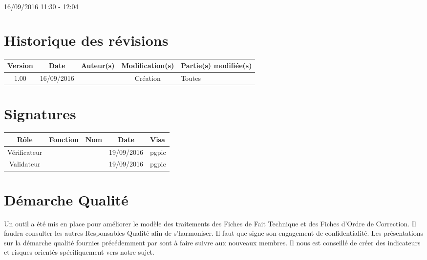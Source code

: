 \documentclass [a4paper] {article}
\begin{document}
\rhead{}

16/09/2016
\hfill   
\hfill 	11:30 - 12:04 				%



\section*{Historique des révisions}
\begin{center}
			\begin{tabular}{| c | c | c | c | p{4cm} |}
				\hline
				\rowcolor{Gray}
				Version & Date & Auteur(s) & Modification(s) & Partie(s) modifiée(s)		 \\
				\hline
				1.00 & 16/09/2016 & \Kafui & Création & Toutes \\
		\hline		
			\end{tabular}
		\end{center}

\section*{Signatures}

		\begin{center}
			\begin{tabular}{| c | c | c | c | p{4cm} |}
				\hline
				\rowcolor{Gray}
				Rôle & Fonction & Nom & Date & Visa		 \\
				\hline
				Vérificateur & \RGC & \Melissa & 19/09/2016 & pgpic \\[30pt]
				\hline
				Validateur & \CP & \Pierre & 19/09/2016 & pgpic \\[30pt]	
				\hline
			\end{tabular}
		\end{center}


\section{Démarche Qualité}
\paragraph*{}
Un outil a été mis en place pour améliorer le modèle des traitements des Fiches de Fait Technique et des Fiches d'Ordre de Correction. Il faudra consulter les autres Responsables Qualité afin de s'harmoniser. Il faut que \Juliana{} signe son engagement de confidentialité. Les présentations sur la démarche qualité fournies précédemment par \nomTuteurQualite{} sont à faire suivre aux nouveaux membres. Il nous est conseillé de créer des indicateurs et risques orientés spécifiquement vers notre sujet. 
\end{document}
